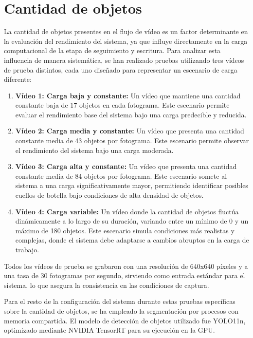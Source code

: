 \documentclass[11pt,spanish,listoffigures,listoftables]{tfgetsinf}
\begin{document}
\section{Cantidad de objetos} \label{sec:cantidad_objetos}
La cantidad de objetos presentes en el flujo de vídeo es un factor determinante en la evaluación del rendimiento del sistema, ya que influye directamente en la carga computacional de la etapa de seguimiento y escritura. Para analizar esta influencia de manera sistemática, se han realizado pruebas utilizando tres vídeos de prueba distintos, cada uno diseñado para representar un escenario de carga diferente:
\begin{enumerate}


   \item \textbf{Vídeo 1: Carga baja y constante:} Un vídeo que mantiene una cantidad constante baja de 17 objetos en cada fotograma. Este escenario permite evaluar el rendimiento base del sistema bajo una carga predecible y reducida.
   \item \textbf{Vídeo 2: Carga media y constante:} Un vídeo que presenta una cantidad constante media de 43 objetos por fotograma. Este escenario permite observar el rendimiento del sistema bajo una carga moderada.
   \item \textbf{Vídeo 3: Carga alta y constante:} Un vídeo que presenta una cantidad constante media de 84 objetos por fotograma. Este escenario somete al sistema a una carga significativamente mayor, permitiendo identificar posibles cuellos de botella bajo condiciones de alta densidad de objetos.
   \item \textbf{Vídeo 4: Carga variable:} Un vídeo donde la cantidad de objetos fluctúa dinámicamente a lo largo de su duración, variando entre un mínimo de 0 y un máximo de 180 objetos. Este escenario simula condiciones más realistas y complejas, donde el sistema debe adaptarse a cambios abruptos en la carga de trabajo.
\end{enumerate}
Todos los vídeos de prueba se grabaron con una resolución de 640x640 píxeles y a una tasa de 30 fotogramas por segundo, sirviendo como entrada estándar para el sistema, lo que asegura la consistencia en las condiciones de captura.

Para el resto de la configuración del sistema durante estas pruebas específicas sobre la cantidad de objetos, se ha empleado la segmentación por procesos con memoria compartida. El modelo de detección de objetos utilizado fue YOLO11n, optimizado mediante NVIDIA TensorRT para su ejecución en la GPU.
\end{document}
